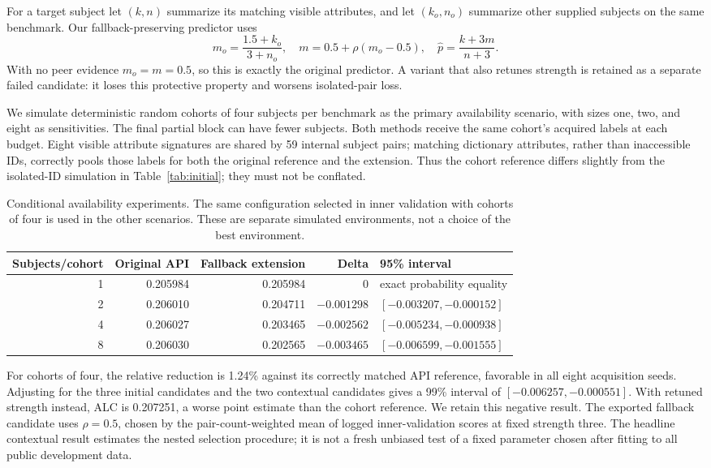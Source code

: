 \documentclass{article}
\begin{document}
For a target subject let $(k,n)$ summarize its matching visible attributes,
and let $(k_o,n_o)$ summarize other supplied subjects on the same benchmark.
Our fallback-preserving predictor uses
\begin{equation}
 m_o=\frac{1.5+k_o}{3+n_o},\quad
 m=0.5+\rho(m_o-0.5),\quad
 \widehat p=\frac{k+3m}{n+3}.
\end{equation}
With no peer evidence $m_o=m=0.5$, so this is exactly the original predictor.
A variant that also retunes strength is retained as a separate failed
candidate: it loses this protective property and worsens isolated-pair loss.

We simulate deterministic random cohorts of four subjects per benchmark as
the primary availability scenario, with sizes one, two, and eight as
sensitivities. The final partial block can have fewer subjects. Both methods
receive the same cohort's acquired labels at each budget. Eight visible
attribute signatures are shared by 59 internal subject pairs; matching
dictionary attributes, rather than inaccessible IDs, correctly pools those
labels for both the original reference and the extension. Thus the cohort
reference differs slightly from the isolated-ID simulation in
Table~\ref{tab:initial}; they must not be conflated.

\begin{table}[t]
\centering\small
\caption{Conditional availability experiments. The same configuration selected
in inner validation with cohorts of four is used in the other scenarios.
These are separate simulated environments, not a choice of the best environment.}
\label{tab:context}
\begin{tabular}{rrrrl}
\toprule
Subjects/cohort & Original API & Fallback extension & Delta & 95\% interval\\
\midrule
1 & 0.205984 & 0.205984 & $0$ & exact probability equality\\
2 & 0.206010 & 0.204711 & $-0.001298$ & $[-0.003207,-0.000152]$\\
4 & 0.206027 & 0.203465 & $-0.002562$ & $[-0.005234,-0.000938]$\\
8 & 0.206030 & 0.202565 & $-0.003465$ & $[-0.006599,-0.001555]$\\
\bottomrule
\end{tabular}
\end{table}

For cohorts of four, the relative reduction is 1.24\% against its correctly
matched API reference, favorable in all eight acquisition seeds. Adjusting
for the three initial candidates and the two contextual candidates gives
a 99\% interval of $[-0.006257,-0.000551]$. With retuned strength instead,
ALC is 0.207251, a worse point estimate than the cohort reference. We retain
this negative result. The exported fallback candidate uses $\rho=0.5$,
chosen by the pair-count-weighted mean of logged inner-validation scores
at fixed strength three. The headline contextual result estimates the
nested selection procedure; it is not a fresh unbiased test of a fixed
parameter chosen after fitting to all public development data.
\end{document}
